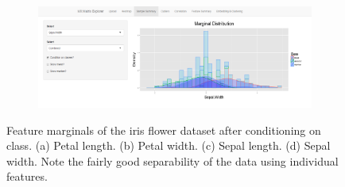 \documentclass[12pt]{article}
\begin{document}
\begin{figure}
\begin{subfigure}[b]{0.8\textwidth}
		\includegraphics[width=\textwidth]{Figures/Iris/MarginalSepalWidth.png}
		\subcaption{}
	\end{subfigure}
	\caption{Feature marginals of the iris flower dataset after conditioning on class. (a) Petal length. (b) Petal width. (c) Sepal length. (d) Sepal width. Note the fairly good separability of the data using individual features.}
	\label{fig:IrisMarginals}
\end{figure}
\end{document}
